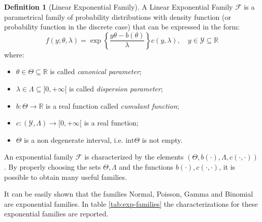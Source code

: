 \documentclass[a4paper, twoside, openright, 12pt]{report}
\theoremstyle{definition}
\newtheorem{definition}{Definition}[chapter]
\theoremstyle{definition}
\theoremstyle{definition}
\theoremstyle{remark}
\begin{document}
\begin{definition}[Linear Exponential Family]
\label{def:linear-exp-family} \iffalse (Linear Exponential Family) \fi{} A Linear Exponential Family \(\mathcal{F}\) is a parametrical family of probability distributions with density function (or probability function in the discrete case) that can be expressed in the form:
\[
f(y; \theta, \lambda) = \exp{\left\{ \frac{y\theta-b(\theta)}{\lambda} \right\}} c(y,\lambda), \quad y\in \mathcal{Y}\subseteq\mathbb{R}
\]
where:

\begin{itemize}
\item $\theta\in\Theta\subseteq\mathbb{R}$ is called \textit{canonical parameter};
\item $\lambda\in\Lambda\subseteq]0, +\infty[$ is called \textit{dispersion parameter};
\item $b: \Theta \rightarrow \mathbb{R}$ is a real function called \textit{cumulant function};
\item $c: (\mathcal{Y}, \Lambda) \rightarrow [0, +\infty[$ is a real function;
\item $\Theta$ is a non degenerate interval, i.e. $\text{int}\Theta$ is not empty.
\end{itemize}
\end{definition}

An exponential family \(\mathcal{F}\) is characterized by the elements \(\left( \Theta, b(\cdot), \Lambda, c(\cdot, \cdot) \right)\). By properly choosing the sets \(\Theta, \Lambda\) and the functions \(b(\cdot), c(\cdot, \cdot)\), it is possible to obtain many useful families.

It can be easily shown that the families Normal, Poisson, Gamma and Binomial are exponential families. In table \ref{tab:exp-families} the characterizations for these exponential families are reported.
\end{document}
